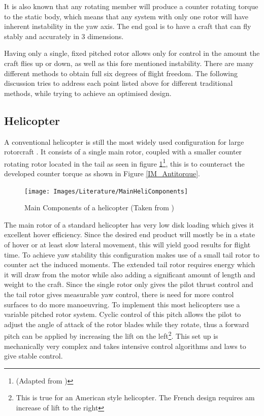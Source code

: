 It is also known that any rotating member will produce a counter rotating torque to the static body, which means that any system with only one rotor will have inherent instability in the yaw axis. The end goal is to have a craft that can fly stably and accurately in 3 dimensions.

Having only a single, fixed pitched rotor allows only for control in the amount the craft flies up or down, as well as this fore mentioned instability. There are many different methods to obtain full six degrees of flight freedom. The following discussion tries to address each point listed above for different traditional methods, while trying to achieve an optimised design.


\subsection{Helicopter}
A conventional helicopter is still the most widely used configuration for large rotorcraft \cite{RotorConfig}. It consists of a single main rotor, coupled with a smaller counter rotating rotor located in the tail as seen in figure \ref{IM_Helicopter}\footnote{(Adapted from \cite{Heli})}, this is to counteract the developed counter torque as shown in Figure \ref{IM_Antitorque}.

\begin{figure}[H]
	\centering
	\texttt{[image: Images/Literature/MainHeliComponents]}     
	\caption{Main Components of a helicopter (Taken from \cite{Heli})}
	\label{IM_Helicopter}
\end{figure}

The main rotor of a standard helicopter has very low disk loading which gives it excellent hover efficiency. Since the desired end product will mostly be in a state of hover or at least slow lateral movement, this will yield good results for flight time. To achieve yaw stability this configuration makes use of a small tail rotor to counter act the induced moments. The extended tail rotor requires energy which it will draw from the motor while also adding a significant amount of length and weight to the craft. Since the single rotor only gives the pilot thrust control and the tail rotor gives measurable yaw control, there is need for more control surfaces to do more manoeuvring. To implement this most helicopters use a variable pitched rotor system. Cyclic control of this pitch allows the pilot to adjust the angle of attack of the rotor blades while they rotate, thus a forward pitch can be applied by increasing the lift on the left\footnote{This is true for an American style helicopter. The French design requires am increase of lift to the right}. This set up is mechanically very complex and takes intensive control algorithms and laws to give stable control.

